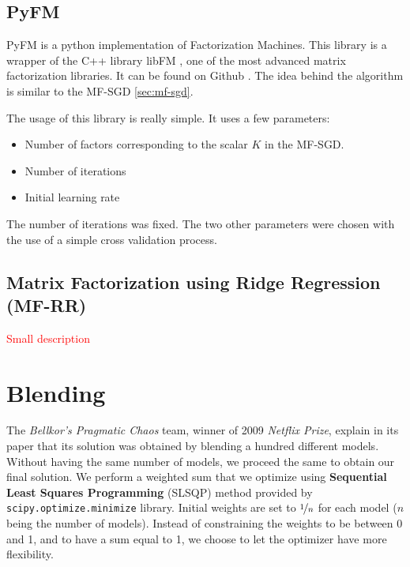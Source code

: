 \documentclass[10pt,conference,compsocconf]{IEEEtran}
\begin{document}
\subsection{PyFM}


PyFM is a python implementation of Factorization Machines. This library is a wrapper of the C++ library libFM \cite{rendle:tist2012}, one of the most advanced matrix factorization libraries. It can be found on Github \cite{pyfm}. The idea behind the algorithm is similar to the MF-SGD \ref{sec:mf-sgd}. 

The usage of this library is really simple. It uses a few parameters:
\begin{itemize}
 \item Number of factors corresponding to the scalar $K$ in the MF-SGD.
 \item Number of iterations
 \item Initial learning rate
\end{itemize}

The number of iterations was fixed. The two other parameters were chosen with the use of a simple cross validation process.

\subsection{Matrix Factorization using Ridge Regression (MF-RR)}

\textcolor{red}{Small description}

\section{Blending}
\label{sec:blending}

The \textit{Bellkor's Pragmatic Chaos} team, winner of 2009 \textit{Netflix Prize}, explain in its paper that its solution was obtained by blending a hundred different models. \cite{BellKore_netflix} Without having the same number of models, we proceed the same to obtain our final solution. We perform a weighted sum that we optimize using \textbf{Sequential Least Squares Programming} (SLSQP) method provided by \texttt{scipy.optimize.minimize} library. Initial weights are set to $\nicefrac{1}{n}$ for each model ($n$ being the number of models). Instead of constraining the weights to be between 0 and 1, and to have a sum equal to 1, we choose to let the optimizer have more flexibility.
\end{document}
